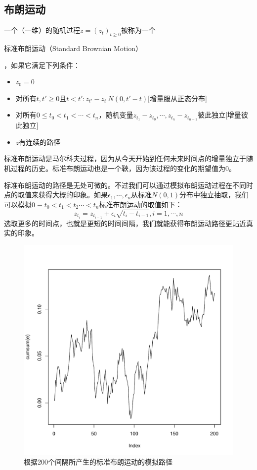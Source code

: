 \documentclass[UTF8]{ctexart}
\newcommand \qd[1] {\begin{qds} {#1} \end{qds}}
\begin{document}
\subsection{布朗运动}

一个（一维）的随机过程$z=(z_t)_{t \geqslant 0}$被称为一个\qd{标准布朗运动（Standard Brownian Motion）}，如果它满足下列条件：
\begin{itemize}
    \item{$z_0=0$}
    \item{对所有$t,t' \geqslant 0 \text{且} t<t':z_{t'}-z_t~N(0,t'-t)$[增量服从正态分布]}
    \item{对所有$0 \leqslant t_0 < t_1 < \cdots < t_n$，随机变量$z_{t_1}-z_{t_0},\cdots,z_{t_n}-z_{t_{n-1}}$彼此独立[增量彼此独立]}
    \item{$z$有连续的路径}
\end{itemize}

标准布朗运动是马尔科夫过程，因为从今天开始到任何未来时间点的增量独立于随机过程的历史。标准布朗运动也是一个鞅，因为该过程的变化的期望值为0。

标准布朗运动的路径是无处可微的。不过我们可以通过模拟布朗运动过程在不同时点的取值来获得大概的印象。如果$\epsilon_1,\cdots,\epsilon_n$从标准$N(0,1)$分布中独立抽取，我们可以模拟$0 \equiv t_0 <t_1 <t_2 \cdots <t_n$标准布朗运动的取值如下：
$$z_{t_i}=z_{t_{i-1}}+\epsilon_i \sqrt{t_i-t_{i-1}},i=1,\cdots,n$$
选取更多的时间点，也就是更短的时间间隔，我们就能获得布朗运动路径更贴近真实的印象。

\begin{figure}[H]
    \centering
    \includegraphics[scale=0.6]{P41.pdf}
    \caption*{根据200个间隔所产生的标准布朗运动的模拟路径}
    \label{fig:BrownMotion1}
\end{figure}
\end{document}
